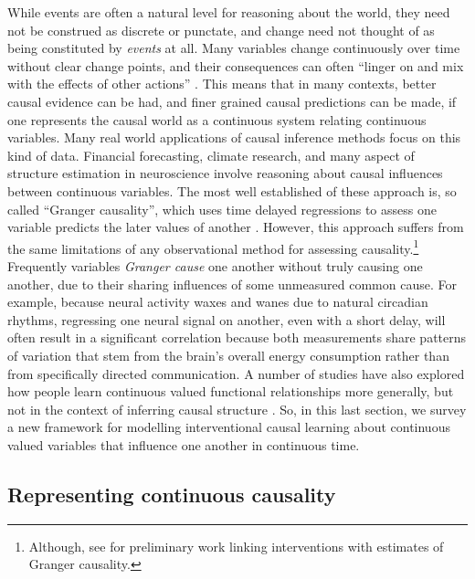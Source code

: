 \documentclass{cambridge7A}%
\begin{document}
While events are often a natural level for reasoning about the world, they need not be construed as discrete or punctate, and change need not thought of as being constituted by \emph{events} at all.  Many variables change continuously over time without clear change points, and their consequences can often ``linger on and mix with the effects of other actions'' \citep{jordan1992forward}. This means that in many contexts, better causal evidence can be had, and finer grained causal predictions can be made, if one represents the causal world as a continuous system relating continuous variables.  Many real world applications of causal inference methods focus on this kind of data.  Financial forecasting, climate research, and many aspect of structure estimation in neuroscience involve reasoning about causal influences between continuous variables.   The most well established of these approach is, so called ``Granger causality'', which uses time delayed regressions to assess one variable predicts the later values of another \citep{granger1969investigating}.  However, this approach suffers from the same limitations of any observational method for assessing causality.\footnote{Although, see \citep{eichler2010granger} for preliminary work linking interventions with estimates of Granger causality.}  Frequently variables \emph{Granger cause} one another without truly causing one another, due to their sharing influences of some unmeasured common cause.  For example, because neural activity waxes and wanes due to natural circadian rhythms, regressing one neural signal on another, even with a short delay, will often result in a significant correlation because both measurements share patterns of variation that stem from the brain's overall energy consumption rather than from specifically directed communication.  %
A number of studies have also explored how people learn continuous valued functional relationships more generally, but not in the context of inferring causal structure \citep{pacer2011rational,griffiths2009modeling,schulz2017compositional}.  So, in this last section, we survey a new framework for modelling interventional causal learning about continuous valued variables that influence one another in continuous time.  



\subsection{Representing continuous causality}
\end{document}
